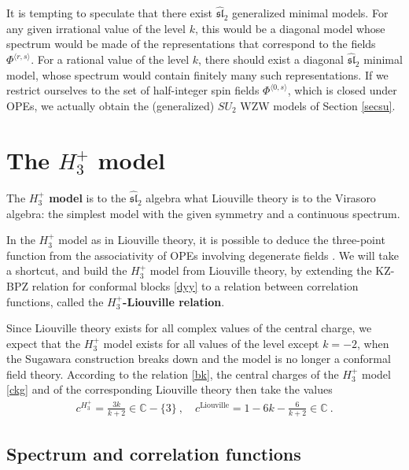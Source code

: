 \documentclass[12pt, a4paper, notitlepage, twoside]{report}
\numberwithin{equation}{section}
\theoremstyle{break}
\begin{document}
It is tempting to speculate that there exist $\widehat{\mathfrak{sl}}_2$ generalized minimal models.
For any given irrational value of the level $k$, this would be a diagonal model whose spectrum would be made of the representations that correspond to the fields $\Phi^{\langle r, s\rangle}$. For a rational value of the level $k$, there should exist a diagonal $\widehat{\mathfrak{sl}}_2$ minimal model, whose spectrum would contain finitely many such representations.
If we restrict ourselves to the set of half-integer spin fields $\Phi^{\langle 0, s\rangle}$, which is closed under OPEs, we actually obtain the (generalized) $SU_2$ WZW models of Section \ref{secsu}.


\section{The \texorpdfstring{$H_3^+$}{H3+} model\label{sechtp}}

The \textbf{\boldmath $H_3^+$ model} is to the $\widehat{\mathfrak{sl}}_2$ algebra what Liouville theory is to the Virasoro algebra: the simplest model with the given symmetry and a continuous spectrum. 

In the $H_3^+$ model as in Liouville theory, it is possible to deduce the three-point function from the associativity of OPEs involving degenerate fields \cite{tes97a}.
We will take a shortcut, and build the $H_3^+$ model from Liouville theory, by extending the KZ-BPZ relation for conformal blocks \eqref{dyy} to a relation between correlation functions, called the \textbf{\boldmath $H_3^+$-Liouville relation}.

Since Liouville theory exists for all complex values of the central charge, we expect that the $H_3^+$ model exists for all values of the level except $k=-2$, when the Sugawara construction breaks down and the model is no longer a conformal field theory.
According to the relation \eqref{bk}, the central charges of the $H_3^+$ model \eqref{ckg} and of the corresponding Liouville theory then take the values
\begin{align}
 \boxed{c^{H_3^+} = \frac{3k}{k+2} \in \mathbb{C}-\{3\}} \ , \quad c^{\text{Liouville}} = 1-6k-\frac{6}{k+2}\in \mathbb{C}\ .
\end{align} 

\subsection{Spectrum and correlation functions}
\end{document}
